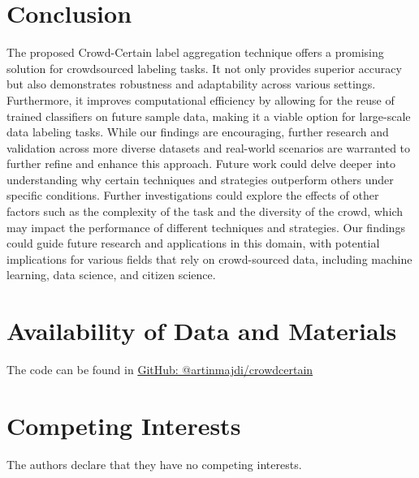 \section{Conclusion}\label{sec:crowd.conclusion}
The proposed Crowd-Certain label aggregation technique offers a promising solution for crowdsourced labeling tasks. It not only provides superior accuracy but also demonstrates robustness and adaptability across various settings. Furthermore, it improves computational efficiency by allowing for the reuse of trained classifiers on future sample data, making it a viable option for large-scale data labeling tasks. While our findings are encouraging, further research and validation across more diverse datasets and real-world scenarios are warranted to further refine and enhance this approach. Future work could delve deeper into understanding why certain techniques and strategies outperform others under specific conditions. Further investigations could explore the effects of other factors such as the complexity of the task and the diversity of the crowd, which may impact the performance of different techniques and strategies. Our findings could guide future research and applications in this domain, with potential implications for various fields that rely on crowd-sourced data, including machine learning, data science, and citizen science.

\section{Availability of Data and Materials}
The code can be found in \href{https://github.com/artinmajdi/crowdcertain}{GitHub: @artinmajdi/crowdcertain}

\section*{Competing Interests}
The authors declare that they have no competing interests.
